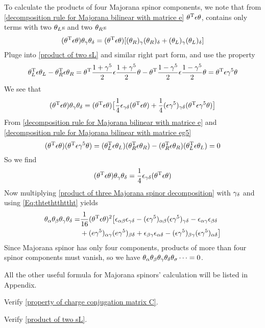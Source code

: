 To calculate the products of four Majorana spinor components, we note that from \eqref{decomposition rule for Majorana bilinear with matrice e} $\theta^{\text{T}}\epsilon\theta$, contains only terms with two $\theta_L$s and two $\theta_R$s
\begin{equation}
    (\theta^{\text{T}}\epsilon\theta)\theta_\gamma \theta_\delta
    =(\theta^{\text{T}}\epsilon\theta)[(\theta_R)_\gamma(\theta_R)_\delta + (\theta_L)_\gamma(\theta_L)_\delta]
\end{equation}
Pluge into \eqref{product of two sL} and similar right part form, and use the property
\begin{equation}\label{decomposition rule for Majorana bilinear with matrice eg5}
   \theta_L^{\text{T}}\epsilon\theta_L - \theta_R^{\text{T}}\epsilon\theta_R 
   = \theta^{\text{T}}\frac{1+\gamma^5}{2}\epsilon
   \frac{1+\gamma^5}{2}\theta
   -\theta^{\text{T}}\frac{1-\gamma^5}{2}\epsilon
   \frac{1-\gamma^5}{2}\theta
   = \theta^{\text{T}} \epsilon \gamma^5 \theta
\end{equation}
We see that
\begin{equation}
    (\theta^{\text{T}}\epsilon\theta)\theta_\gamma \theta_\delta
    =(\theta^{\text{T}}\epsilon\theta)
    \big[
    \frac{1}{4}\epsilon_{\gamma\delta}
    (\theta^{\text{T}}\epsilon\theta)
    +\frac{1}{4}(\epsilon\gamma^5)_{\gamma\delta}
    (\theta^{\text{T}} \epsilon \gamma^5 \theta)
    \big]
\end{equation}
From \eqref{decomposition rule for Majorana bilinear with matrice e} and \eqref{decomposition rule for Majorana bilinear with matrice eg5}
\begin{equation}
   (\theta^{\text{T}}\epsilon\theta)(\theta^{\text{T}} \epsilon \gamma^5 \theta)
   = (\theta_L^{\text{T}}\epsilon\theta_L)
   (\theta_R^{\text{T}}\epsilon\theta_R)
   -(\theta_R^{\text{T}}\epsilon\theta_R)
   (\theta_L^{\text{T}}\epsilon\theta_L)
   =0
\end{equation}
So we find
\begin{equation}\label{Eq:thtethtthttht}
  (\theta^{\text{T}}\epsilon\theta)\theta_\gamma \theta_\delta
  =\frac{1}{4}
  \epsilon_{\gamma\delta}
  (\theta^{\text{T}}\epsilon\theta)
\end{equation}
Now multiplying \eqref{product of three Majorana spinor decomposition} with $\gamma_\delta$ and using \eqref{Eq:thtethtthttht}
yields
\begin{align}\label{product of the four Majorana spinor decompositon}
   \theta_\alpha\theta_\beta\theta_\gamma\theta_\delta
   =&\frac{1}{16}(\theta^{\text{T}}\epsilon\theta)^2
   \big[
     \epsilon_{\alpha\beta}\epsilon_{\gamma\delta}
     -(\epsilon\gamma^5)_{\alpha\beta}(\epsilon\gamma^5)_{\gamma\delta}
     -\epsilon_{\alpha\gamma}\epsilon_{\beta\delta}\notag\\
     &+(e\gamma^5)_{\alpha\gamma}(e\gamma^5)_{\beta\delta}
     +\epsilon_{\beta\gamma}\epsilon_{\alpha\delta}
     -(\epsilon\gamma^5)_{\beta\gamma}(\epsilon\gamma^5)_{\alpha\delta}
   \big]
\end{align}
Since  Majorana spinor has only four components, products of more than four spinor components must vanish, so we have $\theta_\alpha\theta_\beta\theta_\gamma\theta_\delta\theta_\sigma \cdots = 0$.

All the other useful formula for Majorana spinors' calculation will be listed in Appendix.


\begin{Exe}
	Verify \eqref{property of charge conjugation matrix C}.
\end{Exe}

\begin{Exe} \label{Exe: product of two sL}
	Verify \eqref{product of two sL}.
\end{Exe}




    
